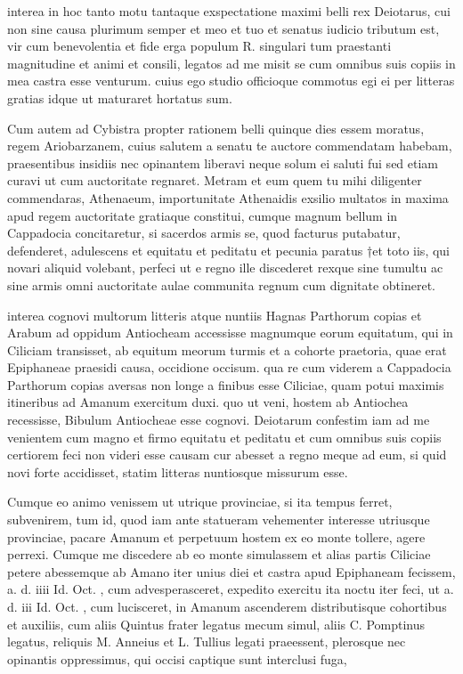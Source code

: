  interea in hoc tanto motu tantaque exspectatione maximi belli rex Deiotarus, cui non sine causa plurimum semper et meo et tuo et senatus iudicio tributum est, vir cum benevolentia et fide erga populum R. singulari tum praestanti magnitudine et animi et consili, legatos ad me misit se cum omnibus suis copiis in mea castra esse venturum. cuius ego studio officioque commotus egi ei per litteras gratias idque ut maturaret hortatus sum.

 Cum autem ad Cybistra propter rationem belli quinque dies essem moratus, regem Ariobarzanem, cuius salutem a senatu te auctore commendatam habebam, praesentibus insidiis nec opinantem liberavi neque solum ei saluti fui sed etiam curavi ut cum auctoritate regnaret. Metram et eum quem tu mihi diligenter commendaras, Athenaeum, importunitate Athenaidis exsilio multatos in maxima apud regem auctoritate gratiaque constitui, cumque magnum bellum in Cappadocia concitaretur, si sacerdos armis se, quod facturus putabatur, defenderet, adulescens et equitatu et peditatu et pecunia paratus †et toto iis, qui novari aliquid volebant, perfeci ut e regno ille discederet rexque sine tumultu ac sine armis omni auctoritate aulae communita regnum cum dignitate obtineret.

 interea cognovi multorum litteris atque nuntiis Hagnas Parthorum copias et Arabum ad oppidum Antiocheam accessisse magnumque eorum equitatum, qui in Ciliciam transisset, ab equitum meorum turmis et a cohorte praetoria, quae erat Epiphaneae praesidi causa, occidione occisum. qua re cum viderem a Cappadocia Parthorum copias aversas non longe a finibus esse Ciliciae, quam potui maximis itineribus ad Amanum exercitum duxi. quo ut veni, hostem ab Antiochea recessisse, Bibulum Antiocheae esse cognovi. Deiotarum confestim iam ad me venientem cum magno et firmo equitatu et peditatu et cum omnibus suis copiis certiorem feci non videri esse causam cur abesset a regno meque ad eum, si quid novi forte accidisset, statim litteras nuntiosque missurum esse.

 Cumque eo animo venissem ut utrique provinciae, si ita tempus ferret, subvenirem, tum id, quod iam ante statueram vehementer interesse utriusque provinciae, pacare Amanum et perpetuum hostem ex eo monte tollere, agere perrexi. Cumque me discedere ab eo monte simulassem et alias partis Ciliciae petere abessemque ab Amano iter unius diei et castra apud Epiphaneam fecissem, a. d. iiii Id. Oct. , cum advesperasceret, expedito exercitu ita noctu iter feci, ut a. d. iii Id. Oct. , cum lucisceret, in Amanum ascenderem distributisque cohortibus et auxiliis, cum aliis Quintus frater legatus mecum simul, aliis C. Pomptinus legatus, reliquis M. Anneius et L. Tullius legati praeessent, plerosque nec opinantis oppressimus, qui occisi captique sunt interclusi fuga,

